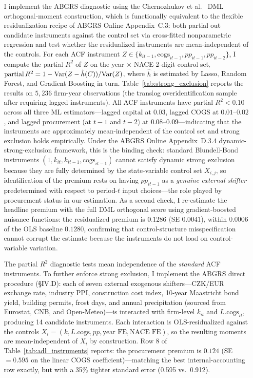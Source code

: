 \documentclass[11pt]{article}
\begin{document}
I implement the ABGRS diagnostic using the Chernozhukov et al.~\cite{ChernozhukovDML2018} DML orthogonal-moment construction, which is functionally equivalent to the flexible residualization recipe of ABGRS \cite{ABGRS2025} Online Appendix~C.3: both partial out candidate instruments against the control set via cross-fitted nonparametric regression and test whether the residualized instruments are mean-independent of the controls. For each ACF instrument $Z \in \{k_{it-1}, \text{cogs}_{it-1}, pp_{it-1}, pp_{it-2}\}$, I compute the partial $R^2$ of $Z$ on the year $\times$ NACE 2-digit control set, $\text{partial\,}R^2 = 1 - \text{Var}(Z - \hat h(C))/\text{Var}(Z)$, where $\hat h$ is estimated by Lasso, Random Forest, and Gradient Boosting in turn. Table~\ref{tab:strong_exclusion} reports the results on $5{,}236$ firm-year observations (the translog overidentification sample after requiring lagged instruments). All ACF instruments have partial $R^2 < 0.10$ across all three ML estimators---lagged capital at $0.03$, lagged COGS at $0.01$--$0.02$, and lagged procurement (at $t{-}1$ and $t{-}2$) at $0.08$--$0.09$---indicating that the instruments are approximately mean-independent of the control set and strong exclusion holds empirically. Under the ABGRS \cite{ABGRS2025} Online Appendix~D.3.4 dynamic-strong-exclusion framework, this is the binding check: standard Blundell-Bond instruments $(1, k_{it}, k_{it-1}, \text{cogs}_{it-1})$ cannot satisfy dynamic strong exclusion because they are fully determined by the state-variable control set $X_{i,j}$, so identification of the premium rests on having $pp_{it-1}$ as a \emph{genuine external shifter} predetermined with respect to period-$t$ input choices---the role played by procurement status in our estimation. As a second check, I re-estimate the headline premium with the full DML orthogonal score using gradient-boosted nuisance functions: the residualized premium is $0.1286$ (SE $0.0041$), within $0.0006$ of the OLS baseline $0.1280$, confirming that control-structure misspecification cannot corrupt the estimate because the instruments do not load on control-variable variation.



The partial $R^2$ diagnostic tests mean independence of the \emph{standard} ACF instruments. To further enforce strong exclusion, I implement the ABGRS direct procedure (\S IV.D): each of seven external exogenous shifters---CZK/EUR exchange rate, industry PPI, construction cost index, 10-year Maastricht bond yield, building permits, frost days, and annual precipitation (sourced from Eurostat, CNB, and Open-Meteo)---is interacted with firm-level $k_{it}$ and $L.\text{cogs}_{it}$, producing 14 candidate instruments. Each interaction is OLS-residualized against the controls $X_i = (k, L.\text{cogs}, pp, \text{year FE}, \text{NACE FE})$, so the resulting moments are mean-independent of $X_i$ by construction. Row 8 of Table~\ref{tab:adl_instruments} reports: the procurement premium is $0.124$ (SE $= 0.595$ on the linear COGS coefficient)---matching the best internal-accounting row exactly, but with a 35\% tighter standard error (0.595 vs.\ 0.912).
\end{document}
